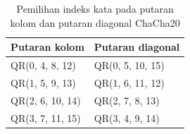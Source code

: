 \begin{table}[htbp]
\centering
\small
\begin{tabular}{@{}l l@{}}
\hline
\textbf{Putaran kolom} & \textbf{Putaran diagonal} \\
\hline
QR(0, 4, 8, 12)  & QR(0, 5, 10, 15) \\
QR(1, 5, 9, 13)  & QR(1, 6, 11, 12) \\
QR(2, 6, 10, 14) & QR(2, 7, 8, 13) \\
QR(3, 7, 11, 15) & QR(3, 4, 9, 14) \\
\hline
\end{tabular}
\caption{Pemilihan indeks kata pada putaran kolom dan putaran diagonal ChaCha20}
\label{tab:chacha-round}
\end{table}
